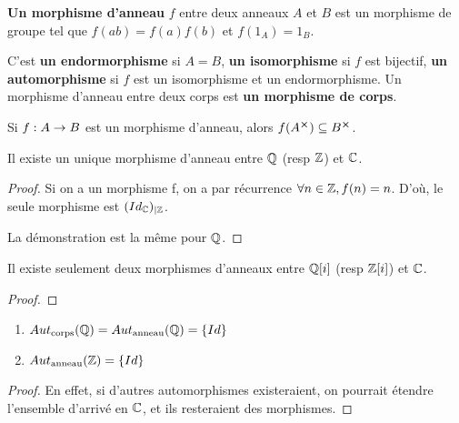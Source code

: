 \begin{definition}
	\textbf{Un morphisme d'anneau} $f$ entre deux anneaux $A$ et $B$ est un
	morphisme de groupe tel que $f(ab) = f(a) f(b)$ et $f(1_{A}) = 1_{B}$.

	C'est \textbf{un endormorphisme} si $A = B$, \textbf{un isomorphisme} si $f$
	est bijectif, \textbf{un automorphisme} si $f$ est un isomorphisme et un
	endormorphisme. Un morphisme d'anneau entre deux corps est \textbf{un
	morphisme de corps}.
\end{definition}

\begin{remarque}
	Si $f : A \rightarrow B$ est un morphisme d'anneau, alors $f(A^{\cross})
	\subseteq B^{\cross}$.
\end{remarque}

\begin{proposition}
	Il existe un unique morphisme d'anneau entre $\mathbb{Q}$ (resp $\mathbb{Z}$)
	et $\mathbb{C}$.
\end{proposition}

\ifdefined\outputproof
\begin{proof}
	Si on a un morphisme f, on a par récurrence $\forall n \in \mathbb{Z}, f(n) =
	n$. D'où, le seule morphisme est $({Id_{\mathbb{C}}})_{|\mathbb{Z}}$.

	La démonstration est la même pour $\mathbb{Q}$.
\end{proof}
\fi

\begin{proposition}
	Il existe seulement deux morphismes d'anneaux entre $\mathbb{Q}[i]$ (resp
	$\mathbb{Z}[i]$) et $\mathbb{C}$.
\end{proposition}

\ifdefined\outputproof
\begin{proof}

\end{proof}
\fi

\begin{corollary}
	\begin{enumerate}
		\item $Aut_{\text{corps}}(\mathbb{Q}) =
			Aut_{\text{anneau}}(\mathbb{Q}) = \left\{ Id \right\}$
		\item $Aut_{\text{anneau}}(\mathbb{Z}) = \left\{ Id \right\}$
	\end{enumerate}
\end{corollary}

\ifdefined\outputproof
\begin{proof}
	En effet, si d'autres automorphismes existeraient, on pourrait étendre
	l'ensemble d'arrivé en $\mathbb{C}$, et ils resteraient des morphismes.
\end{proof}
\fi

